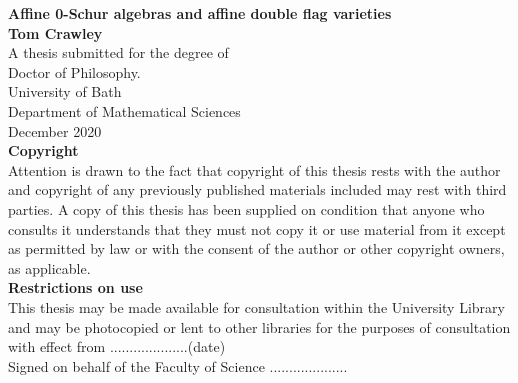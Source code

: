 \begin{titlepage}
\begin{center}
\vspace*{1cm}
\Huge
\textbf{Affine 0-Schur algebras and affine double flag varieties}\\
\vspace{0.7cm}
\Large
\textbf{Tom Crawley}\\
\vfill
A thesis submitted for the degree of\\
Doctor of Philosophy.\\
\vspace{0.7cm}
\large
University of Bath\\
Department of Mathematical Sciences\\
December 2020\\

\vspace{0.7cm}
\normalsize
\textbf{Copyright}\\
\vspace{0.7cm}
Attention is drawn to the fact that copyright of this thesis rests with the author and copyright of any previously published materials included may rest with third parties. A copy of this thesis has been supplied on condition that anyone who consults it understands that they must not copy it or use material from it except as permitted by law or with the consent of the author or other copyright owners, as applicable.\\

\vspace{0.7cm}
\textbf{Restrictions on use}\\
\vspace{0.7cm}
This thesis may be made available for consultation within the University Library and may be photocopied or lent to other libraries for the purposes of consultation with effect from ....................(date)\\
Signed on behalf of the Faculty of Science ....................\\
\end{center}
\end{titlepage}